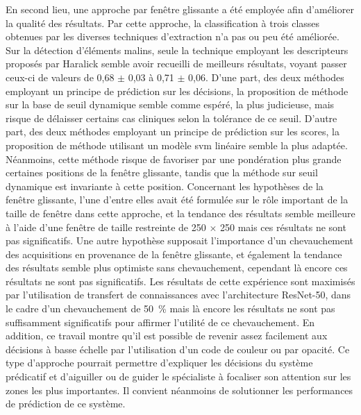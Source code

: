 En second lieu, une approche par fenêtre glissante a été employée afin d'améliorer la qualité des résultats. Par cette approche, la classification à trois classes obtenues par les diverses techniques d'extraction n'a pas ou peu été améliorée. Sur la détection d'éléments malins, seule la technique employant les descripteurs proposés par Haralick semble avoir recueilli de meilleurs résultats, voyant passer ceux-ci de valeurs de \fscore{} 0,68 $\pm$ 0,03 à 0,71 $\pm$ 0,06. D'une part, des deux méthodes employant un principe de prédiction sur les décisions, la proposition de méthode sur la base de seuil dynamique semble comme espéré, la plus judicieuse, mais risque de délaisser certains cas cliniques selon la tolérance de ce seuil. D'autre part, des deux méthodes employant un principe de prédiction sur les scores, la proposition de méthode utilisant un modèle \gls{svm} linéaire semble la plus adaptée. Néanmoins, cette méthode risque de favoriser par une pondération plus grande certaines positions de la fenêtre glissante, tandis que la méthode sur seuil dynamique est invariante à cette position. Concernant les hypothèses de la fenêtre glissante, l'une d'entre elles avait été formulée sur le rôle important de la taille de fenêtre dans cette approche, et la tendance des résultats semble meilleure à l'aide d’une fenêtre de taille restreinte de 250 $\times$ 250 mais ces résultats ne sont pas significatifs. Une autre hypothèse supposait l'importance d'un chevauchement des acquisitions en provenance de la fenêtre glissante, et également la tendance des résultats semble plus optimiste sans chevauchement, cependant là encore ces résultats ne sont pas significatifs. Les résultats de cette expérience sont maximisés par l'utilisation de transfert de connaissances avec l'architecture ResNet-50, dans le cadre d'un chevauchement de 50~\% mais là encore les résultats ne sont pas suffisamment significatifs pour affirmer l'utilité de ce chevauchement. En addition, ce travail montre qu'il est possible de revenir assez facilement aux décisions à basse échelle par l'utilisation d'un code de couleur ou par opacité. Ce type d'approche pourrait permettre d'expliquer les décisions du système prédicatif et d'aiguiller ou de guider le spécialiste à focaliser son attention sur les zones les plus importantes. Il convient néanmoins de solutionner les performances de prédiction de ce système.\par 


